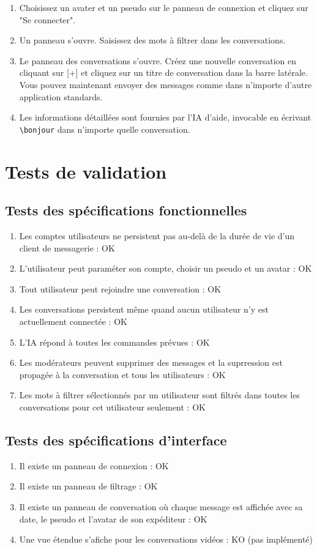 \documentclass[11pt,dvipsnames,svgnames]{report}
\begin{document}
\begin{enumerate}
\item Choisissez un avater et un pseudo sur le panneau de connexion et cliquez sur "Se connecter".
\item Un panneau s'ouvre. Saisissez des mots à filtrer dans les conversations.
\item Le panneau des conversations s'ouvre. Créez une nouvelle conversation en cliquant sur [+] et cliquez sur un titre de conversation dans la barre latérale. Vous pouvez maintenant envoyer des messages comme dans n'importe d'autre application standards.
\item Les informations détaillées sont fournies par l'IA d'aide, invocable en écrivant \texttt{\textbackslash bonjour} dans n'importe quelle conversation.
\end{enumerate}

\section{Tests de validation}
\subsection{Tests des spécifications fonctionnelles}
\begin{enumerate}
\item Les comptes utilisateurs ne persistent pas au-delà de la durée de vie d'un client de messagerie : OK
\item L'utilisateur peut paraméter son compte, choisir un pseudo et un avatar : OK
\item Tout utilisateur peut rejoindre une conversation : OK
\item Les conversations persistent même quand aucun utilisateur n'y est actuellement connectée : OK
\item L'IA répond à toutes les commandes prévues : OK
\item Les modérateurs peuvent supprimer des messages et la suprression est propagée à la conversation et tous les utilisateurs : OK
\item Les mots à filtrer sélectionnés par un utilisateur sont filtrés dans toutes les conversations pour cet utilisateur seulement : OK
\end{enumerate}

\subsection{Tests des spécifications d'interface}
\begin{enumerate}
\item Il existe un panneau de connexion : OK
\item Il existe un panneau de filtrage : OK
\item Il existe un panneau de conversation où chaque message est affichée avec sa date, le pseudo et l'avatar de son expéditeur : OK
\item Une vue étendue s'afiche pour les conversations vidéos : KO (pas implémenté)
\end{enumerate}
\end{document}
